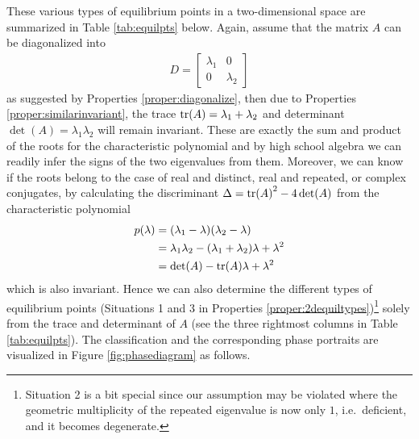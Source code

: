 These various types of equilibrium points in a two-dimensional space are summarized in Table \ref{tab:equilpts} below. Again, assume that the matrix $A$ can be diagonalized into 
\begin{align*}
D = 
\begin{bmatrix}
\lambda_1 & 0 \\
0 & \lambda_2
\end{bmatrix}
\end{align*}
as suggested by Properties \ref{proper:diagonalize}, then due to Properties \ref{proper:similarinvariant}, the trace $\tr(A) = \lambda_1 + \lambda_2$ and determinant $\det(A) = \lambda_1\lambda_2$ will remain invariant. These are exactly the sum and product of the roots for the characteristic polynomial and by high school algebra we can readily infer the signs of the two eigenvalues from them. Moreover, we can know if the roots belong to the case of real and distinct, real and repeated, or complex conjugates, by calculating the discriminant $\Delta = \tr(A)^2 - 4\det(A)$ from the characteristic polynomial 
\begin{align*}
p(\lambda) &= (\lambda_1 - \lambda)(\lambda_2 - \lambda) \\
&= \lambda_1\lambda_2 - (\lambda_1 + \lambda_2)\lambda + \lambda^2 \\
&= \det(A) - \tr(A)\lambda + \lambda^2
\end{align*}
which is also invariant. Hence we can also determine the different types of equilibrium points (Situations 1 and 3 in Properties \ref{proper:2dequiltypes})\footnote{Situation 2 is a bit special since our assumption may be violated where the geometric multiplicity of the repeated eigenvalue is now only $1$, i.e.\ deficient, and it becomes degenerate.} solely from the trace and determinant of $A$ (see the three rightmost columns in Table \ref{tab:equilpts}). The classification and the corresponding phase portraits are visualized in Figure \ref{fig:phasediagram} as follows.
